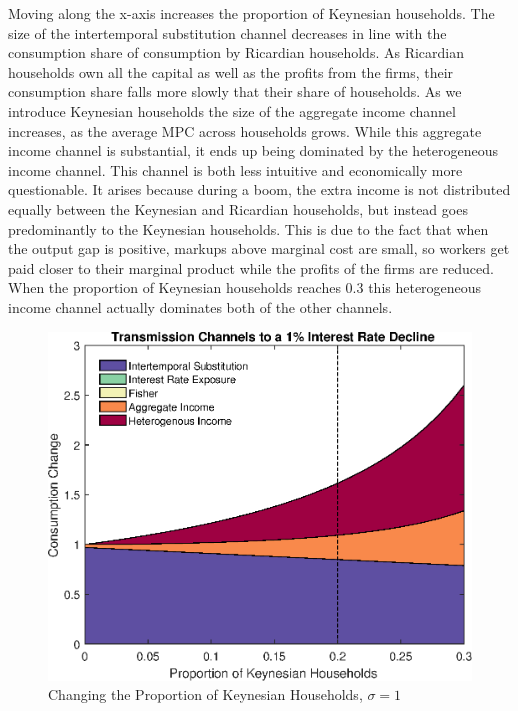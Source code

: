 \documentclass[titlepage]{\econtex}\newcommand{\texname}{ConsumptionHeterogeneity}
\begin{document}
Moving along the x-axis increases the proportion of Keynesian households. The size of the intertemporal substitution channel decreases in line with the consumption share of consumption by Ricardian households. As Ricardian households own all the capital as well as the profits from the firms, their consumption share falls more slowly that their share of households. As we introduce Keynesian households the size of the aggregate income channel increases, as the average MPC across households grows. While this aggregate income channel is substantial, it ends up being dominated by the heterogeneous income channel. This channel is both less intuitive and economically more questionable. It arises because during a boom, the extra income is not distributed equally between the Keynesian and Ricardian households, but instead goes predominantly to the Keynesian households. This is due to the fact that when the output gap is positive, markups above marginal cost are small, so workers get paid closer to their marginal product while the profits of the firms are reduced. When the proportion of Keynesian households reaches 0.3 this heterogeneous income channel actually dominates both of the other channels.

\begin{figure} 
	\begin{centering}
		\includegraphics[scale=0.7]{../Matlab/DynareCode/Figures/ProportionKeynesian_sigma1.eps}
		\caption{Changing the Proportion of Keynesian Households, $\sigma=1$}
		\label{fig:ProportionKeynesian}
	\end{centering}
\end{figure}
\end{document}
